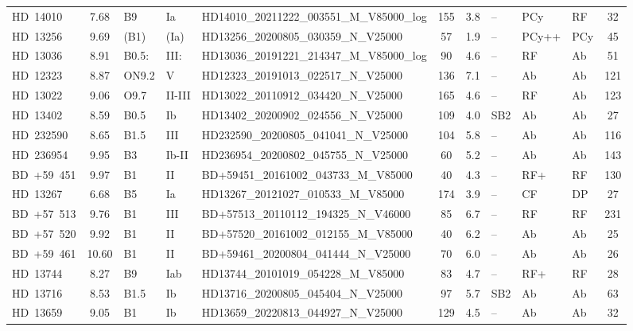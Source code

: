 {\begin{landscape}
\begin{longtable}{lclllcclllc}
\noalign{\smallskip}
HD~14010 & 7.68 & B9 & Ia & HD14010\_20211222\_003551\_M\_V85000\_log & 155 & 3.8 & -- & PCy & RF & 32 \\
\noalign{\smallskip}
HD~13256 & 9.69 & (B1) & (Ia) & HD13256\_20200805\_030359\_N\_V25000 & 57 & 1.9 & -- & PCy++ & PCy & 45 \\
\noalign{\smallskip}
HD~13036 & 8.91 & B0.5: & III: & HD13036\_20191221\_214347\_M\_V85000\_log & 90 & 4.6 & -- & RF & Ab & 51 \\
\noalign{\smallskip}
HD~12323 & 8.87 & ON9.2 & V & HD12323\_20191013\_022517\_N\_V25000 & 136 & 7.1 & -- & Ab & Ab & 121 \\
\noalign{\smallskip}
HD~13022 & 9.06 & O9.7 & II-III & HD13022\_20110912\_034420\_N\_V25000 & 165 & 4.6 & -- & RF & Ab & 123 \\
\noalign{\smallskip}
HD~13402 & 8.59 & B0.5 & Ib & HD13402\_20200902\_024556\_N\_V25000 & 109 & 4.0 & SB2 & Ab & Ab & 27 \\
\noalign{\smallskip}
HD~232590 & 8.65 & B1.5 & III & HD232590\_20200805\_041041\_N\_V25000 & 104 & 5.8 & -- & Ab & Ab & 116 \\
\noalign{\smallskip}
HD~236954 & 9.95 & B3 & Ib-II & HD236954\_20200802\_045755\_N\_V25000 & 60 & 5.2 & -- & Ab & Ab & 143 \\
\noalign{\smallskip}
BD~+59~451 & 9.97 & B1 & II & BD+59451\_20161002\_043733\_M\_V85000 & 40 & 4.3 & -- & RF+ & RF & 130 \\
\noalign{\smallskip}
HD~13267 & 6.68 & B5 & Ia & HD13267\_20121027\_010533\_M\_V85000 & 174 & 3.9 & -- & CF & DP & 27 \\
\noalign{\smallskip}
BD~+57~513 & 9.76 & B1 & III & BD+57513\_20110112\_194325\_N\_V46000 & 85 & 6.7 & -- & RF & RF & 231 \\
\noalign{\smallskip}
BD~+57~520 & 9.92 & B1 & II & BD+57520\_20161002\_012155\_M\_V85000 & 40 & 6.2 & -- & Ab & Ab & 25 \\
\noalign{\smallskip}
BD~+59~461 & 10.60 & B1 & II & BD+59461\_20200804\_041444\_N\_V25000 & 70 & 6.0 & -- & Ab & Ab & 26 \\
\noalign{\smallskip}
HD~13744 & 8.27 & B9 & Iab & HD13744\_20101019\_054228\_M\_V85000 & 83 & 4.7 & -- & RF+ & RF & 28 \\
\noalign{\smallskip}
HD~13716 & 8.53 & B1.5 & Ib & HD13716\_20200805\_045404\_N\_V25000 & 97 & 5.7 & SB2 & Ab & Ab & 63 \\
\noalign{\smallskip}
HD~13659 & 9.05 & B1 & Ib & HD13659\_20220813\_044927\_N\_V25000 & 129 & 4.5 & -- & Ab & Ab & 32 \\

\end{longtable}
\end{landscape}}
